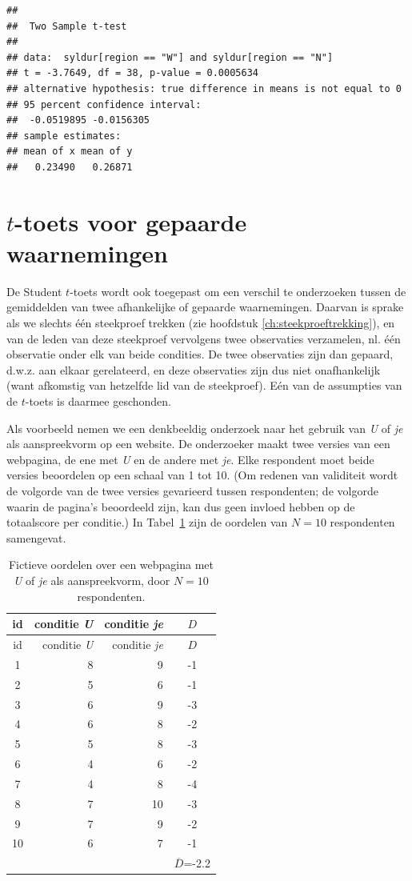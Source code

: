 \documentclass[
]{book}
\begin{document}
\begin{verbatim}
## 
##  Two Sample t-test
## 
## data:  syldur[region == "W"] and syldur[region == "N"]
## t = -3.7649, df = 38, p-value = 0.0005634
## alternative hypothesis: true difference in means is not equal to 0
## 95 percent confidence interval:
##  -0.0519895 -0.0156305
## sample estimates:
## mean of x mean of y 
##   0.23490   0.26871
\end{verbatim}

\hypertarget{sec:ttoets-gepaard}{%
\section{\texorpdfstring{\(t\)-toets voor gepaarde waarnemingen}{t-toets voor gepaarde waarnemingen}}\label{sec:ttoets-gepaard}}

De Student \(t\)-toets wordt ook toegepast om een verschil te onderzoeken tussen de
gemiddelden van twee afhankelijke of gepaarde waarnemingen. Daarvan is
sprake als we slechts één steekproef trekken (zie hoofdstuk
\ref{ch:steekproeftrekking}), en van de leden van deze steekproef
vervolgens twee observaties verzamelen, nl. één observatie onder elk van
beide condities. De twee observaties zijn dan gepaard, d.w.z. aan elkaar
gerelateerd, en deze observaties zijn dus niet onafhankelijk (want
afkomstig van hetzelfde lid van de steekproef). Eén van de assumpties
van de \(t\)-toets is daarmee geschonden.

Als voorbeeld nemen we een denkbeeldig onderzoek naar het gebruik van
\emph{U} of \emph{je} als aanspreekvorm op een website. De onderzoeker maakt twee
versies van een webpagina, de ene met \emph{U} en de andere met \emph{je}. Elke
respondent moet beide versies beoordelen op een schaal van 1 tot 10. (Om
redenen van validiteit wordt de volgorde van de twee versies gevarieerd
tussen respondenten; de volgorde waarin de pagina's beoordeeld zijn, kan
dus geen invloed hebben op de totaalscore per conditie.) In
Tabel~\ref{tab:data-uje-paired} zijn de oordelen van \(N=10\)
respondenten samengevat.

\begin{longtable}[]{@{}crrc@{}}
\caption{\label{tab:data-uje-paired} Fictieve oordelen over een webpagina met \emph{U} of \emph{je} als
aanspreekvorm, door \(N=10\) respondenten.}\tabularnewline
\toprule
id & conditie \emph{U} & conditie \emph{je} & \(D\)\tabularnewline
\midrule
\endfirsthead
\toprule
id & conditie \emph{U} & conditie \emph{je} & \(D\)\tabularnewline
\midrule
\endhead
1 & 8 & 9 & -1\tabularnewline
2 & 5 & 6 & -1\tabularnewline
3 & 6 & 9 & -3\tabularnewline
4 & 6 & 8 & -2\tabularnewline
5 & 5 & 8 & -3\tabularnewline
6 & 4 & 6 & -2\tabularnewline
7 & 4 & 8 & -4\tabularnewline
8 & 7 & 10 & -3\tabularnewline
9 & 7 & 9 & -2\tabularnewline
10 & 6 & 7 & -1\tabularnewline
& & & \(\overline{D}\)=-2.2\tabularnewline
\bottomrule
\end{longtable}
\end{document}
